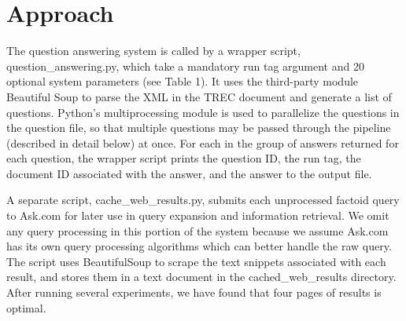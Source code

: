 \documentclass[11pt]{article}
\begin{document}
\section{Approach}

The question answering system is called by a wrapper script, question\_answering.py, which take a mandatory run tag argument and 20 optional system parameters (see Table 1). It uses the third-party module Beautiful Soup to parse the XML in the TREC document and generate a list of questions. Python's multiprocessing module is used to parallelize the questions in the question file, so that multiple questions may be passed through the pipeline (described in detail below) at once. For each in the group of answers returned for each question, the wrapper script prints the question ID, the run tag, the document ID associated with the answer, and the answer to the output file.

A separate script, cache\_web\_results.py, submits each unprocessed factoid query to Ask.com for later use in query expansion and information retrieval. We omit any query processing in this portion of the system because we assume Ask.com has its own query processing algorithms which can better handle the raw query. The script uses BeautifulSoup to scrape the text snippets associated with each result, and stores them in a text document in the cached\_web\_results directory. After running several experiments, we have found that four pages of results is optimal.
\end{document}
